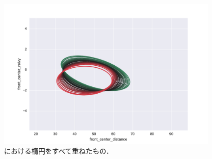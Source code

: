 \begin{figure}[h]
  \centering
    \includegraphics[width=11cm,keepaspectratio]{fig/ellipse_front_center_distance_front_center_relvy.pdf}
  \caption{における楕円をすべて重ねたもの．}
  \label{fig:all_ellipse}
\end{figure}
